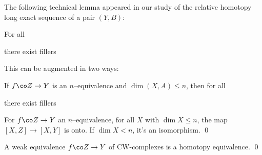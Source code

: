 The following technical lemma appeared in our study of the relative homotopy long exact sequence of a pair $(Y, B)$:
\begin{lemma}[3.14]
For all
\begin{center}
\end{center}
there exist fillers
\begin{center}
\end{center}
\end{lemma}

This can be augmented in two ways:

\begin{lemma}
If $f\co Z \to Y$ is an $n$--equivalence and $\dim(X, A) \le n$, then for all
\begin{center}
\end{center}
there exist fillers
\begin{center}
\end{center}
\end{lemma}

\begin{corollary}
For $f\co Z \to Y$ an $n$--equivalence, for all $X$ with $\dim X \le n$, the map $[X, Z] \to [X, Y]$ is onto.  If $\dim X < n$, it's an isomorphism. \qed
\end{corollary}

\begin{corollary}[Whitehead]
A weak equivalence $f\co Z \to Y$ of CW-complexes is a homotopy equivalence. \qed
\end{corollary}

